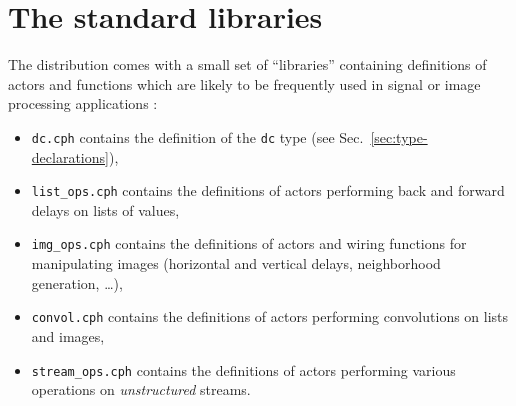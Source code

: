 
\chapter{The \caph standard libraries}
\label{cha:stdlib}

The \caph distribution comes with a small set of ``libraries'' containing definitions of actors and
functions which are likely to be frequently used in signal or image processing applications :

\begin{itemize}
\item \verb|dc.cph| contains the definition of the \verb|dc| type (see Sec.~\ref{sec:type-declarations}),
\item \verb|list_ops.cph| contains the definitions of actors performing back and forward delays on lists of values,
\item \verb|img_ops.cph| contains the definitions of actors and wiring functions for manipulating images
  (horizontal and vertical delays, neighborhood generation, \ldots),
\item \verb|convol.cph| contains the definitions of actors performing convolutions on lists and images,
\item \verb|stream_ops.cph| contains the definitions of actors performing various operations on
  \emph{unstructured} streams.
\end{itemize}

